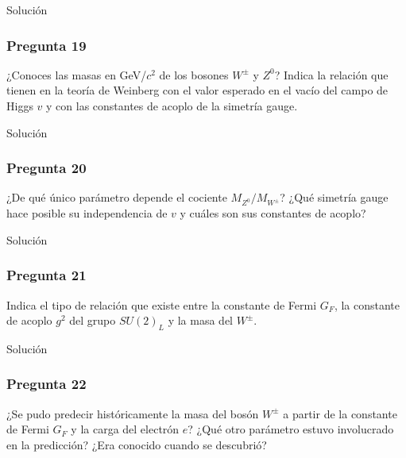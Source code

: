 Solución

\vspace*{2em}

\begin{Enunciado}
	\subsubsection*{Pregunta 19}

	¿Conoces las masas en GeV/$c^2$ de los bosones $W^\pm$ y $Z^0$? Indica la relación que tienen en la teoría de Weinberg con el valor esperado en el vacío del campo de Higgs $v$ y con las constantes de acoplo de la simetría gauge.

\end{Enunciado}

Solución

\vspace*{2em}

\begin{Enunciado}
	\subsubsection*{Pregunta 20}

	¿De qué único parámetro depende el cociente $M_{Z^0}/M_{W^\pm}$? ¿Qué simetría gauge hace posible su independencia de $v$ y cuáles son sus constantes de acoplo?

\end{Enunciado}

Solución

\vspace*{2em}

\begin{Enunciado}
	\subsubsection*{Pregunta 21}

	Indica el tipo de relación que existe entre la constante de Fermi $G_F$, la constante de acoplo $g^2$ del grupo $SU(2)_L$ y la masa del $W^\pm$.

\end{Enunciado}

Solución

\vspace*{2em}

\begin{Enunciado}
	\subsubsection*{Pregunta 22}

	¿Se pudo predecir históricamente la masa del bosón $W^\pm$ a partir de la constante de Fermi $G_F$ y la carga del electrón $e$? ¿Qué otro parámetro estuvo involucrado en la predicción? ¿Era conocido cuando se descubrió?

\end{Enunciado}

